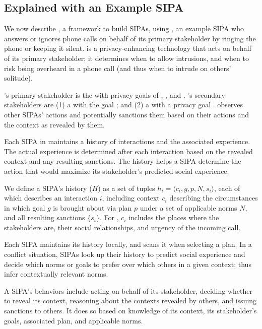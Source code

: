 \subsection{\frameworkB Explained with an Example SIPA} 
%
We now describe \frameworkB, a framework to build SIPAs, using \ringer, an example SIPA who answers or ignores phone calls on behalf of its primary stakeholder by ringing the phone or keeping it silent. \ringer is a privacy-enhancing technology that acts on behalf of its primary stakeholder; it determines when to allow intrusions, and when to risk being overheard in a phone call (and thus when to intrude on others' solitude).

\ringer's primary stakeholder is the  with privacy goals of , , and . \ringer's secondary stakeholders are (1) a  with the goal ; and (2) a  with a privacy goal . \ringer observes other SIPAs' actions and potentially sanctions them based on their actions and the context as revealed by them.

Each SIPA in \frameworkB maintains a history of interactions and the associated experience. The actual experience is determined after each interaction based on the revealed context and any resulting sanctions. The history helps a SIPA determine the action that would maximize its stakeholder's predicted social experience. 

We define a SIPA's history ($H$) as a set of tuples $h_i = \langle c_i, g, p, N, s_i \rangle$, each of which describes an interaction $i$, including context $c_i$ describing the circumstances in which goal $g$ is brought about via plan $p$ under a set of applicable norms $N$, and all resulting sanctions $\{s_i\}$. 
%
For \ringer, $c_i$ includes the places where the stakeholders are, their social relationships, and urgency of the incoming call.

Each SIPA maintains its history locally, and scans it when selecting a plan. In a conflict situation, SIPAs look up their history to predict social experience and decide which norms or goals to prefer over which others in a given context; thus infer contextually relevant norms.

A SIPA's behaviors include acting on behalf of its stakeholder, deciding whether to reveal its context, reasoning about the contexts revealed by others, and issuing sanctions to others. It does so based on knowledge of its context, its stakeholder's goals, associated plan, and applicable norms.

